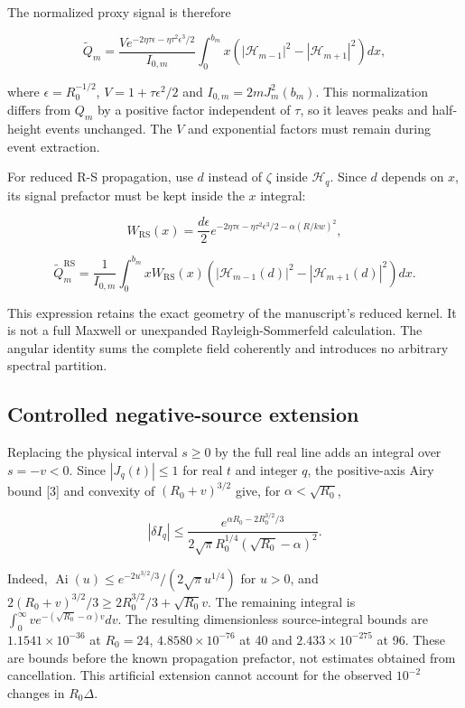 \documentclass[11pt]{article}
\begin{document}
The normalized proxy signal is therefore

\[\widetilde Q_m=\frac{V e^{-2\eta\tau\epsilon-\eta\tau^2\epsilon^3/2}}{I_{0,m}}\int_0^{b_m}x\left(|\mathcal H_{m-1}|^2-|\mathcal H_{m+1}|^2\right)dx,\]

where \(\epsilon=R_0^{-1/2}\), \(V=1+\tau\epsilon^2/2\) and
\(I_{0,m}=2mJ_m^2(b_m)\). This normalization differs from \(Q_m\) by a
positive factor independent of \(\tau\), so it leaves peaks and
half-height events unchanged. The \(V\) and exponential factors must
remain during event extraction.

For reduced R-S propagation, use \(d\) instead of \(\zeta\) inside
\(\mathcal H_q\). Since \(d\) depends on \(x\), its signal prefactor
must be kept inside the \(x\) integral:

\[W_{\mathrm{RS}}(x)=\frac{d\epsilon}{2}e^{-2\eta\tau\epsilon-\eta\tau^2\epsilon^3/2-\alpha(R/kw)^2},\]

\[\widetilde Q_m^{\mathrm{RS}}=\frac{1}{I_{0,m}}\int_0^{b_m}xW_{\mathrm{RS}}(x)\left(|\mathcal H_{m-1}(d)|^2-|\mathcal H_{m+1}(d)|^2\right)dx.\]

This expression retains the exact geometry of the manuscript's reduced
kernel. It is not a full Maxwell or unexpanded Rayleigh-Sommerfeld
calculation. The angular identity sums the complete field coherently and
introduces no arbitrary spectral partition.

\subsection{Controlled negative-source
extension}\label{controlled-negative-source-extension}

Replacing the physical interval \(s\geq0\) by the full real line adds an
integral over \(s=-v<0\). Since \(|J_q(t)|\leq1\) for real \(t\) and
integer \(q\), the positive-axis Airy bound {[}3{]} and convexity of
\((R_0+v)^{3/2}\) give, for \(\alpha<\sqrt{R_0}\),

\[|\delta I_q|\leq\frac{e^{\alpha R_0-2R_0^{3/2}/3}}{2\sqrt\pi R_0^{1/4}(\sqrt{R_0}-\alpha)^2}.\]

Indeed, \(\operatorname{Ai}(u)\leq e^{-2u^{3/2}/3}/(2\sqrt\pi u^{1/4})\)
for \(u>0\), and \(2(R_0+v)^{3/2}/3\geq2R_0^{3/2}/3+\sqrt{R_0}v\). The
remaining integral is \(\int_0^\infty v e^{-(\sqrt{R_0}-\alpha)v}dv\).
The resulting dimensionless source-integral bounds are
\(1.1541\times10^{-36}\) at \(R_0=24\), \(4.8580\times10^{-76}\) at 40
and \(2.433\times10^{-275}\) at 96. These are bounds before the known
propagation prefactor, not estimates obtained from cancellation. This
artificial extension cannot account for the observed \(10^{-2}\) changes
in \(R_0\Delta\).
\end{document}
